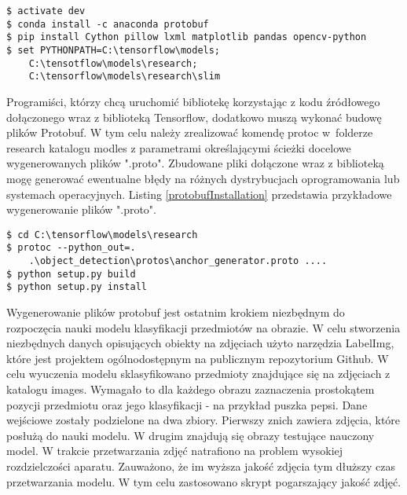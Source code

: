 \begin{lstlisting}[caption={Instalacja bibliotek.}, label={terminalConfiguration} ]
$ activate dev
$ conda install -c anaconda protobuf
$ pip install Cython pillow lxml matplotlib pandas opencv-python
$ set PYTHONPATH=C:\tensorflow\models;
	C:\tensotflow\models\research;
	C:\tensorflow\models\research\slim
\end{lstlisting}

Programiści, którzy chcą uruchomić bibliotekę korzystając z kodu źródłowego dołączonego wraz z biblioteką Tensorflow, dodatkowo muszą wykonać budowę plików Protobuf. W tym celu należy zrealizować komendę protoc w~folderze research katalogu modles z parametrami określającymi ścieżki docelowe wygenerowanych plików ".proto". Zbudowane pliki dołączone wraz z biblioteką mogę generować ewentualne błędy na różnych dystrybucjach oprogramowania lub systemach operacyjnych. Listing \ref{protobufInstallation} przedstawia przykładowe wygenerowanie plików ".proto".

\begin{lstlisting}[caption={generowanie plików protobuf.}, label={protobufInstallation} ]
$ cd C:\tensorflow\models\research
$ protoc --python_out=. 
	.\object_detection\protos\anchor_generator.proto ....
$ python setup.py build
$ python setup.py install
\end{lstlisting}

Wygenerowanie plików protobuf jest ostatnim krokiem niezbędnym do rozpoczęcia nauki modelu klasyfikacji przedmiotów na obrazie. W celu stworzenia niezbędnych danych opisujących obiekty na zdjęciach użyto narzędzia LabelImg, które jest projektem ogólnodostępnym na publicznym repozytorium Github. W celu wyuczenia modelu sklasyfikowano przedmioty znajdujące się na zdjęciach z katalogu images. Wymagało to dla każdego obrazu zaznaczenia prostokątem pozycji przedmiotu oraz jego klasyfikacji - na przykład puszka pepsi. Dane wejściowe zostały podzielone na dwa zbiory. Pierwszy znich zawiera zdjęcia, które posłużą do nauki modelu. W drugim znajdują się obrazy testujące nauczony model. W trakcie przetwarzania zdjęć natrafiono na problem wysokiej rozdzielczości aparatu. Zauważono, że im wyższa jakość zdjęcia tym dłuższy czas przetwarzania modelu. W tym celu zastosowano skrypt pogarszający jakość zdjęć. 

